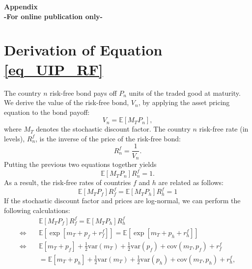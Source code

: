 \appendix

\begin{center}
  {\Huge\bf Appendix}\\
  {\large\bf -For online publication only-}
\end{center}

\section{Derivation of Equation \ref{eq_UIP_RF} \label{Appendix_ReducedFormResults}}

The country $n$ risk-free bond pays off $P_n$ units of the traded good at maturity. We derive the value of the risk-free bond, $V_n$, by applying the asset pricing equation to the bond payoff: 
\begin{equation*}
  V_n = \mathbb{E}\left[M_{T} P_n
  \right],
\end{equation*}
where $M_{T}$ denotes the stochastic discount factor. The country $n$ risk-free rate (in levels), $R^f_n$, is the inverse of the price of the risk-free bond:
\begin{equation*}
  R^f_n = \frac{1}{V_n}.
\end{equation*}
Putting the previous two equations together yields
\begin{equation*}
  \mathbb{E}\left[ M_T P_n \right] R^f_n = 1.
\end{equation*}
As a result, the risk-free rates of countries $f$ and $h$ are related as follows:
\begin{equation*}
  \mathbb{E}\left[M_T P_f \right] R^f_f 
  = \mathbb{E}\left[M_T P_h \right] R^f_h = 1
\end{equation*} 
If the stochastic discount factor and prices are log-normal, we can perform the following calculations:
\begin{align*}
  & \mathbb{E}\left[M_{T} P_f \right] R^f_f
    = \mathbb{E}\left[M_{T} P_h \right] R^f_h \\
  \Leftrightarrow\quad
  & \mathbb{E}\left[\exp\left[ m_T + p_f + r^f_f \right]\right]
    = \mathbb{E}\left[\exp\left[ m_T + p_h + r^f_h \right]\right] \\
  \Leftrightarrow\quad
  & \mathbb{E}\left[m_T + p_f\right] + \frac{1}{2}\text{var}\left(m_T\right) +      \frac{1}{2}\text{var}\left(p_f\right) + \text{cov}\left(m_{T}, p_f\right) + r^f_f \\
  & = \mathbb{E}\left[m_{T}+ p_h\right] + \frac{1}{2}\text{var}\left(m_{T}\right) + \frac{1}{2}\text{var}\left(p_h\right) + \text{cov}\left(m_T, p_h\right) + r^f_h,
\end{align*}
